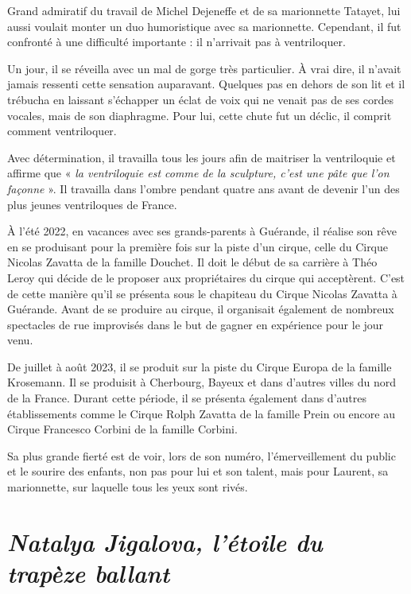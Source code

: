 Grand admiratif du travail de Michel Dejeneffe et de sa marionnette Tatayet, lui aussi voulait monter un duo humoristique avec sa marionnette. Cependant, il fut confronté à une difficulté importante : il n’arrivait pas à ventriloquer.

Un jour, il se réveilla avec un mal de gorge très particulier. À vrai dire, il n’avait jamais ressenti cette sensation auparavant. Quelques pas en dehors de son lit et il trébucha en laissant s’échapper un éclat de voix qui ne venait pas de ses cordes vocales, mais de son diaphragme. Pour lui, cette chute fut un déclic, il comprit comment ventriloquer.

Avec détermination, il travailla tous les jours afin de maitriser la ventriloquie et affirme que « \textit{la ventriloquie est comme de la sculpture, c’est une pâte que l’on façonne} ». Il travailla dans l’ombre pendant quatre ans avant de devenir l’un des plus jeunes ventriloques de France.

À l’été 2022, en vacances avec ses grands-parents à Guérande, il réalise son rêve en se produisant pour la première fois sur la piste d’un cirque, celle du Cirque Nicolas Zavatta de la famille Douchet. Il doit le début de sa carrière à Théo Leroy qui décide de le proposer aux propriétaires du cirque qui acceptèrent. C’est de cette manière qu’il se présenta sous le chapiteau du Cirque Nicolas Zavatta à Guérande. Avant de se produire au cirque, il organisait également de nombreux spectacles de rue improvisés dans le but de gagner en expérience pour le jour venu.

De juillet à août 2023, il se produit sur la piste du Cirque Europa de la famille Krosemann. Il se produisit à Cherbourg, Bayeux et dans d’autres villes du nord de la France. Durant cette période, il se présenta également dans d’autres établissements comme le Cirque Rolph Zavatta de la famille Prein ou encore au Cirque Francesco Corbini de la famille Corbini.

Sa plus grande fierté est de voir, lors de son numéro, l’émerveillement du public et le sourire des enfants, non pas pour lui et son talent, mais pour Laurent, sa marionnette, sur laquelle tous les yeux sont rivés.

\section*{\textit{Natalya Jigalova, l’étoile du trapèze ballant }}
{}

